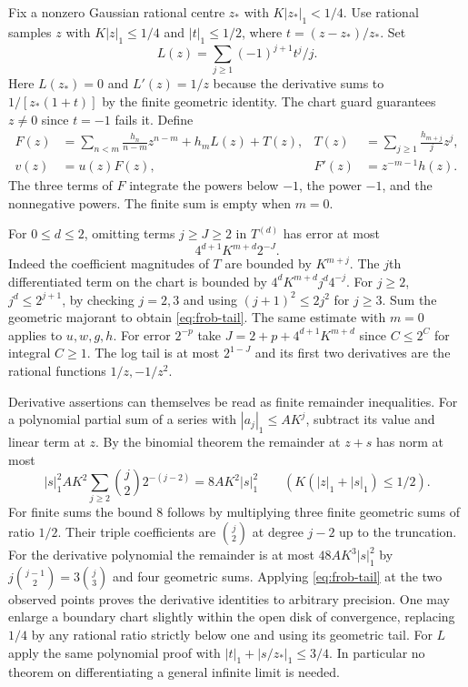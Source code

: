 Fix a nonzero Gaussian rational centre $z_*$ with $K|z_*|_1<1/4$.
Use rational samples $z$ with $K|z|_1\le1/4$ and
$|t|_1\le1/2$, where $t=(z-z_*)/z_*$. Set
\[
 L(z)=\sum_{j\ge1}(-1)^{j+1}t^j/j .
\]
Here $L(z_*)=0$ and $L'(z)=1/z$ because the derivative sums to
$1/[z_*(1+t)]$ by the finite geometric identity. The chart guard
guarantees $z\ne0$ since $t=-1$ fails it. Define
\begin{align}
 F(z)&=\sum_{n<m}\frac{h_n}{n-m}z^{n-m}+h_m L(z)+T(z), &
 T(z)&=\sum_{j\ge1}\frac{h_{m+j}}{j}z^j, \nonumber\\
 v(z)&=u(z)F(z), & F'(z)&=z^{-m-1}h(z). \label{eq:frob-pri}
\end{align}
The three terms of $F$ integrate the powers below $-1$, the power $-1$,
and the nonnegative powers. The finite sum is empty when $m=0$.

For $0\le d\le2$, omitting terms $j\ge J\ge 2$ in $T^{(d)}$
has error at most
\begin{equation}
                   4^{d+1}K^{m+d}2^{-J}.                   \label{eq:frob-tail}
\end{equation}
Indeed the coefficient magnitudes of $T$ are bounded by $K^{m+j}$.
The $j$th differentiated term on the chart is bounded by
$4^d K^{m+d}j^d4^{-j}$. For $j\ge2$, $j^d\le2^{j+1}$, by checking
$j=2,3$ and using $(j+1)^2\le2j^2$ for $j\ge3$. Sum the geometric
majorant to obtain \eqref{eq:frob-tail}. The same estimate with $m=0$
applies to $u,w,g,h$. For error $2^{-p}$ take
$J=2+p+4^{d+1}K^{m+d}$ since $C\le2^C$ for integral $C\ge1$.
The log tail is at most $2^{1-J}$ and its first two derivatives are the
rational functions $1/z,-1/z^2$.

Derivative assertions can themselves be read as finite remainder inequalities.
For a polynomial partial sum of a series with $|a_j|_1\le AK^j$, subtract
its value and linear term at $z$. By the binomial theorem the remainder at
$z+s$ has norm at most
\[
 |s|_1^2 AK^2\sum_{j\ge2}\binom j2 2^{-(j-2)}
 =8AK^2 |s|_1^2\qquad (K(|z|_1+|s|_1)\le1/2).
\]
For finite sums the bound $8$ follows by multiplying three finite geometric
sums of ratio $1/2$. Their triple coefficients are $\binom j2$ at
degree $j-2$ up to the truncation. For the derivative polynomial the
remainder is at most $48AK^3|s|_1^2$ by
$j\binom{j-1}{2}=3\binom j3$ and four geometric sums. Applying
\eqref{eq:frob-tail} at the two observed points proves the derivative
identities to arbitrary precision. One may enlarge a boundary chart
slightly within the open disk of convergence, replacing $1/4$ by any
rational ratio strictly below one and using its geometric tail. For $L$
apply the same polynomial proof with $|t|_1+|s/z_*|_1\le3/4$.
In particular no theorem on differentiating a general infinite limit
is needed.

